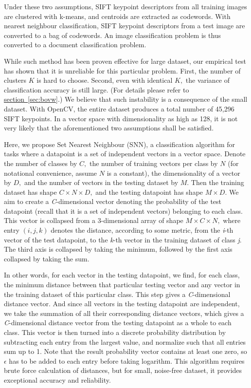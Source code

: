 \documentclass[11pt,a4paper]{article}
\begin{document}
Under these two assumptions, SIFT keypoint descriptors from all training images are clustered with k-means, and centroids are extracted as codewords. With nearest neighbour classification, SIFT keypoint descriptors from a test image are converted to a bag of codewords. An image classification problem is thus converted to a document classification problem.

While such method has been proven effective for large dataset, our empirical test has shown that it is unreliable for this particular problem. First, the number of clusters $K$ is hard to choose. Second, even with identical $K,$ the variance of classification accuracy is still large. (For details please refer to \hyperref[sec:bovw]{section~\ref{sec:bovw}}.) We believe that such instability is a consequence of the small dataset. With OpenCV, the entire dataset produces a total number of 45,296 SIFT keypoints. In a vector space with dimensionality as high as 128, it is not very likely that the aforementioned two assumptions shall be satisfied.

Here, we propose Set Nearest Neighbour (SNN), a classification algorithm for tasks where a datapoint is a set of independent vectors in a vector space. Denote the number of classes by $C,$ the number of training vectors per class by $N$ (for notational convenience, assume $N$ is a constant), the dimensionality of a vector by $D,$ and the number of vectors in the testing dataset by $M.$ Then the training dataset has shape $C\times N\times D,$ and the testing datapoint has shape $M\times D.$ We aim to create a \emph{C}-dimensional vector denoting the probability of the test datapoint (recall that it is a set of independent vectors) belonging to each class. This vector is collapsed from a 3-dimensional array of shape $M\times C\times N,$ where entry $(i,j,k)$ denotes the distance, according to some metric, from the \emph{i}-th vector of the test datapoint, to the \emph{k}-th vector in the training dataset of class \emph{j}. The third axis is collapsed by taking the minimum, followed by the first axis collapsed by taking the sum.

In other words, for each vector in the testing datapoint, we find, for each class, the minimum distance between that particular testing vector and any vector in the training dataset of this particular class. This step gives a \emph{C}-dimensional distance vector. And since all vectors in the testing datapoint are independent, we take the summation of all their corresponding distance vectors, which gives a \emph{C}-dimensional distance vector from the testing datapoint as a whole to each class. This vector is then turned into a discrete probability distribution by subtracting each entry from the largest value, and normalize such that all entries sum up to 1. Note that the result probability vector contains at least one zero, so $\epsilon$ has to be added to each entry before taking logarithm. This algorithm requires brute force calculation of distances, but for small, noise-free dataset, it provides exceptional accuracy and reliability.
\end{document}
